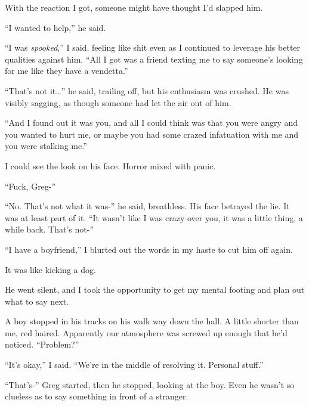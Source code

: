 With the reaction I got, someone might have thought I'd slapped him.



``I wanted to help,'' he said.



``I was \emph{spooked},'' I said, feeling like shit even as I continued to leverage his better qualities against him.  ``All I got was a friend texting me to say someone's looking for me like they have a vendetta.''



``That's not it\ldots'' he said, trailing off, but his enthusiasm was crushed.  He was visibly sagging, as though someone had let the air out of him.



``And I found out it was you, and all I could think was that you were angry and you wanted to hurt me, or maybe you had some crazed infatuation with me and you were stalking me.''



I could see the look on his face.  Horror mixed with panic.



``Fuck, Greg-''



``No.  That's not what it was-'' he said, breathless.  His face betrayed the lie.  It was at least part of it.  ``It wasn't like I was crazy over you, it was a little thing, a while back.  That's not-''



``I have a boyfriend,'' I blurted out the words in my haste to cut him off again.



It was like kicking a dog.



He went silent, and I took the opportunity to get my mental footing and plan out what to say next.



A boy stopped in his tracks on his walk way down the hall.  A little shorter than me, red haired.  Apparently our atmosphere was screwed up enough that he'd noticed.  ``Problem?''



``It's okay,'' I said.  ``We're in the middle of resolving it.  Personal stuff.''



``That's-'' Greg started, then he stopped, looking at the boy.  Even he wasn't so clueless as to say something in front of a stranger.



